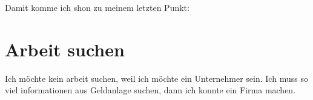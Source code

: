 \documentclass{article}
\begin{document}
Damit komme ich shon zu meinem letzten Punkt: 

\section{Arbeit suchen}

Ich möchte kein arbeit suchen, weil ich möchte ein Unternehmer sein.
Ich muss so viel informationen aus Geldanlage suchen, dann ich konnte ein Firma machen.

%
%

\end{document}
